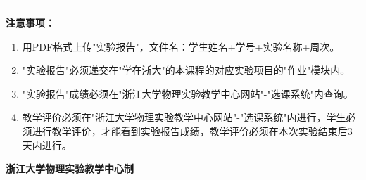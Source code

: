 \documentclass[a4paper,12pt]{article}
\begin{document}
\vfill

\noindent\rule{\textwidth}{0.4pt}

{\fontsize{12pt}{18pt}\selectfont
\textbf{注意事项：}
\begin{enumerate}[label=\arabic*., leftmargin=2em, nosep]
    \item 用PDF格式上传"实验报告"，文件名：学生姓名+学号+实验名称+周次。
    \item "实验报告"必须递交在"学在浙大"的本课程的对应实验项目的"作业"模块内。
    \item "实验报告"成绩必须在"浙江大学物理实验教学中心网站"-"选课系统"内查询。
    \item 教学评价必须在"浙江大学物理实验教学中心网站"-"选课系统"内进行，学生必须进行教学评价，才能看到实验报告成绩，教学评价必须在本次实验结束后3天内进行。
\end{enumerate}
}

\vspace{0.5cm}
\begin{center}
    {\fontsize{12pt}{18pt}\selectfont \textbf{浙江大学物理实验教学中心制}}
\end{center}
\end{document}

